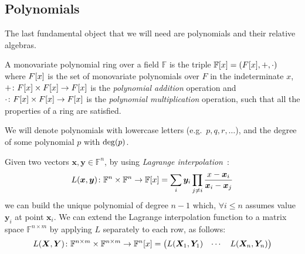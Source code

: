 \subsection{Polynomials}
The last fundamental object that we will need are polynomials and their relative algebras. 
\begin{definition}
  A monovariate polynomial ring over a field \(\mathbb{F}\) is the triple 
  \(\extend{\mathbb{F}}{x} = \Tuple{\extend{F}{x}, +, \cdot}\) where \(\extend{F}{x}\) is the set 
  of monovariate polynomials over \(F\) in the indeterminate \(x\), 
  \(+\colon \extend{F}{x} \times \extend{F}{x} \to \extend{F}{x}\) is the \emph{polynomial addition}
  operation and \(\cdot\colon \extend{F}{x} \times \extend{F}{x} \to \extend{F}{x}\) is the
  \emph{polynomial multiplication} operation, such that all the properties of a ring are satisfied.
\end{definition}

We will denote polynomials with lowercase letters (e.g.\  \(p, q, r, \dots \)), and the degree of 
some polynomial \(p\) with \(\call{\deg}{p}\).

Given two vectors \(\bm{x}, \bm{y} \in \mathbb{F}^n\), by using 
\emph{Lagrange interpolation}~\cite{Waring1779}:
\[
  \call{L}{\bm{x}, \bm{y}}\colon \mathbb{F}^n \times \mathbb{F}^n \to \extend{\mathbb{F}}{x} = 
  \sum_{i}{\bm{y}_i\prod_{j \neq i}{\frac{x - \bm{x}_i}{\bm{x}_i - \bm{x}_j}}}
\]
we can build the unique polynomial of degree \(n - 1\) which, \(\forall i \le n\) assumes 
value \(\bm{y}_i\) at point \(\bm{x}_i\).
We can extend the Lagrange interpolation function to a matrix space \(\mathbb{F}^{n \times m}\)
by applying \(L\) separately to each row, as follows:
\[
  \call{L}{\bm{X}, \bm{Y}}\colon \mathbb{F}^{n \times m} \times \mathbb{F}^{n \times m} \to 
  \extend{\mathbb{F}^n}{x} = 
  \begin{pmatrix*} 
    \call{L}{\bm{X}_1, \bm{Y}_1} & \cdots & \call{L}{\bm{X}_n, \bm{Y}_n}
  \end{pmatrix*}
\]
